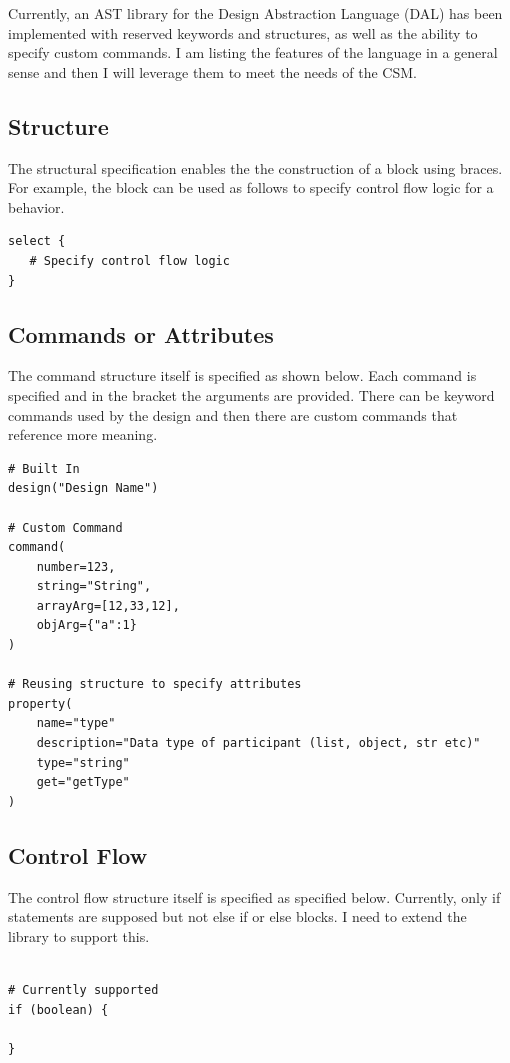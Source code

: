 Currently, an AST library for the Design Abstraction Language (DAL) has been implemented with reserved keywords and structures, as well as the ability to specify custom commands. I am listing the features of the language in a general sense and then I will leverage them to meet the needs of the CSM.

\subsection{Structure}

The structural specification enables the the construction of a block using braces. For example, the block can be used as follows to specify control flow logic for a behavior.

\begin{verbatim}
select {
   # Specify control flow logic
}
\end{verbatim}

\subsection{Commands or Attributes}

The command structure itself is specified as shown below. Each command is specified and in the bracket the arguments are provided. There can be keyword commands used by the design and then there are custom commands that reference more meaning.

\begin{verbatim}
# Built In
design("Design Name")

# Custom Command
command(
    number=123, 
    string="String", 
    arrayArg=[12,33,12], 
    objArg={"a":1}
)

# Reusing structure to specify attributes
property(
    name="type"
    description="Data type of participant (list, object, str etc)"
    type="string"
    get="getType"
)
\end{verbatim}

\subsection{Control Flow}

The control flow structure itself is specified as specified below. Currently, only if statements are supposed but not else if or else blocks. I need to extend the library to support this.

\begin{verbatim}

# Currently supported
if (boolean) {
    
}
\end{verbatim}

